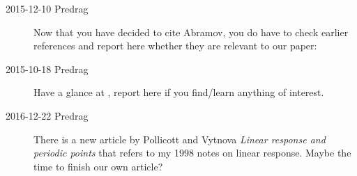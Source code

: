 \begin{description}
\item[2015-12-10 Predrag]
Now that you have decided to cite Abramov, you do have to
check earlier references and report here whether they are relevant to our
paper:

\item[2015-10-18 Predrag]
Have a glance at
,
report here if you find/learn anything of interest.

\item[2016-12-22 Predrag] There is a new article by
Pollicott and Vytnova
{\em Linear response and periodic points}
that refers to my 1998 notes on linear response. Maybe the
time to finish our own article?


\end{description}
